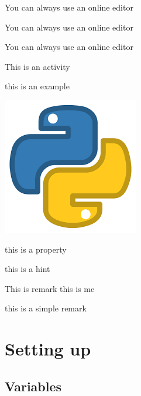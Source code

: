 \documentclass[12pt,a4paper,violet]{bbe}
\begin{document}
	\begin{definition}
	You can always use an online editor
	\end{definition}
	
	\begin{theorem}
	You can always use an online editor
	\end{theorem}
	
	\begin{solution}
	You can always use an online editor
	\end{solution}
	
	\begin{activity}
	This is an activity
	\end{activity}
	
	\begin{example}
	this is an example
	\end{example}
	
	
	\includegraphics[scale=0.6]{icons/python.png}
	 
	
	\begin{property}
	    this is a property
	\end{property}

    \begin{hint}
        this is a hint
    \end{hint}
	
	\begin{remark}
	This is remark this is me
	\end{remark}
	
	\begin{mynote}
	this is a simple remark
	\end{mynote}
	
    
    
	\chapter{Setting up}
	\section{Variables}
	
	
	
	\blinddocument
\end{document}
